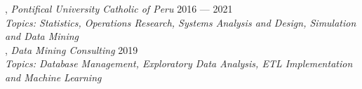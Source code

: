 , \textit{Pontifical University Catholic of Peru}	\hfill 2016 --- 2021 \\
\indent \textit{Topics: Statistics, Operations Research, Systems Analysis and Design, Simulation and Data Mining} \\
, \textit{Data Mining Consulting} \hfill 2019 \\
\indent \textit{Topics: Database Management, Exploratory Data Analysis, ETL Implementation and Machine Learning} \\
